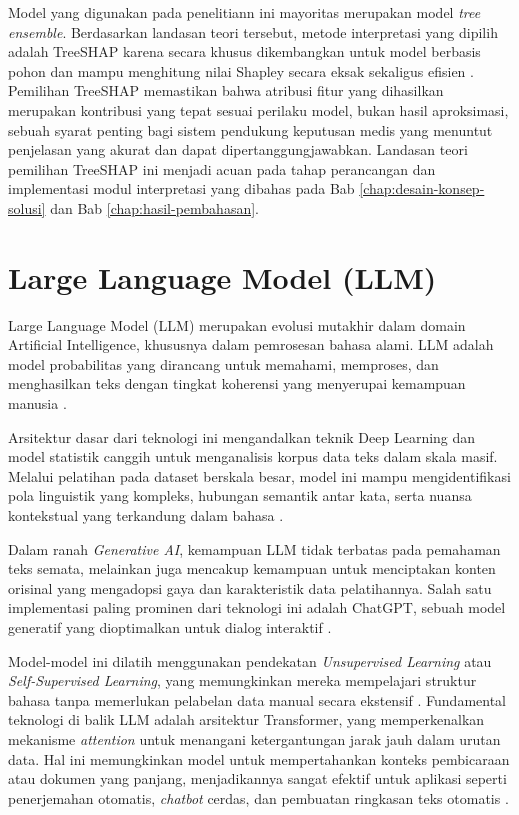 Model yang digunakan pada penelitiann ini mayoritas merupakan model \emph{tree ensemble}. Berdasarkan landasan teori tersebut, metode interpretasi yang dipilih adalah TreeSHAP karena secara khusus dikembangkan untuk model berbasis pohon dan mampu menghitung nilai Shapley secara eksak sekaligus efisien \autocite{Lundberg2020TreeSHAP}. Pemilihan TreeSHAP memastikan bahwa atribusi fitur yang dihasilkan merupakan kontribusi yang tepat sesuai perilaku model, bukan hasil aproksimasi, sebuah syarat penting bagi sistem pendukung keputusan medis yang menuntut penjelasan yang akurat dan dapat dipertanggungjawabkan. Landasan teori pemilihan TreeSHAP ini menjadi acuan pada tahap perancangan dan implementasi modul interpretasi yang dibahas pada Bab \ref{chap:desain-konsep-solusi} dan Bab \ref{chap:hasil-pembahasan}.

\section{Large Language Model (LLM)}
Large Language Model (LLM) merupakan evolusi mutakhir dalam domain Artificial Intelligence, khususnya dalam pemrosesan bahasa alami. LLM adalah model probabilitas yang dirancang untuk memahami, memproses, dan menghasilkan teks dengan tingkat koherensi yang menyerupai kemampuan manusia \autocite{Naveed2023Comprehensive}.

Arsitektur dasar dari teknologi ini mengandalkan teknik Deep Learning dan model statistik canggih untuk menganalisis korpus data teks dalam skala masif. Melalui pelatihan pada dataset berskala besar, model ini mampu mengidentifikasi pola linguistik yang kompleks, hubungan semantik antar kata, serta nuansa kontekstual yang terkandung dalam bahasa \autocite{Kasneci2023ChatGPT}.

Dalam ranah \emph{Generative AI}, kemampuan LLM tidak terbatas pada pemahaman teks semata, melainkan juga mencakup kemampuan untuk menciptakan konten orisinal yang mengadopsi gaya dan karakteristik data pelatihannya. Salah satu implementasi paling prominen dari teknologi ini adalah ChatGPT, sebuah model generatif yang dioptimalkan untuk dialog interaktif \autocite{OpenAI2023GPT4}.

Model-model ini dilatih menggunakan pendekatan \emph{Unsupervised Learning} atau \emph{Self-Supervised Learning}, yang memungkinkan mereka mempelajari struktur bahasa tanpa memerlukan pelabelan data manual secara ekstensif \autocite{Brown2020Language}. Fundamental teknologi di balik LLM adalah arsitektur Transformer, yang memperkenalkan mekanisme \emph{attention} untuk menangani ketergantungan jarak jauh dalam urutan data. Hal ini memungkinkan model untuk mempertahankan konteks pembicaraan atau dokumen yang panjang, menjadikannya sangat efektif untuk aplikasi seperti penerjemahan otomatis, \emph{chatbot} cerdas, dan pembuatan ringkasan teks otomatis \autocite{Vaswani2017Attention, Naveed2023Comprehensive}.


